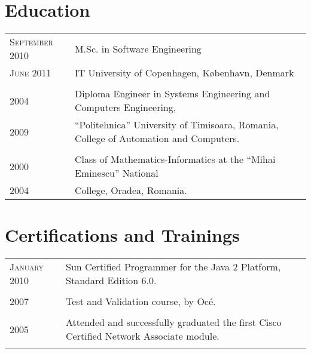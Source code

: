 \documentclass[a4paper,10pt]{article}
\begin{document}
\section{Education}
\begin{tabular}{p{2.5cm}|p{11cm}}
\raggedleft \textsc{September 2010} & M.Sc. in Software Engineering \\
\raggedleft \textsc{June 2011} & IT University of Copenhagen, København,
Denmark \\ \multicolumn{2}{c}{} \\
\raggedleft \textsc{2004} & Diploma Engineer in Systems Engineering and
Computers Engineering, \\ \raggedleft \textsc{2009} & ``Politehnica'' University of Timisoara, Romania, College of Automation and
Computers.
\\\multicolumn{2}{c}{} \\ \raggedleft \textsc{2000} & Class of Mathematics-Informatics at the
``Mihai Eminescu'' National \\ \raggedleft \textsc{2004} &
College, Oradea, Romania.\\
\end{tabular}

\section{Certifications and Trainings}
\begin{tabular}{p{2.5cm}|p{11cm}}
\raggedleft \textsc{January 2010} & Sun Certified Programmer for the Java 2
Platform, Standard Edition 6.0. 
\\
\multicolumn{2}{c}{}
\\
 \raggedleft \textsc{2007} & Test and Validation course, by Oc\'e.\\
\multicolumn{2}{c}{} 
\\ 
\raggedleft  \textsc{2005} & Attended and successfully
graduated the first Cisco Certified Network Associate module.\\ \multicolumn{2}{c}{} \\
\end{tabular}

\end{document}

